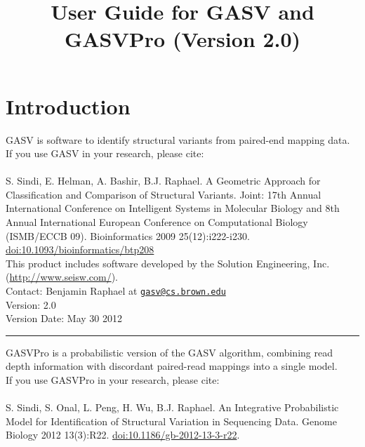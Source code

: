 \documentclass[11pt]{article}
\title{User Guide for GASV and GASVPro (Version 2.0)}
\date{}                                           %
\newcommand{\sectionline}{
  \nointerlineskip \vspace{\baselineskip}
  \hspace{\fill}\rule{0.3\linewidth}{.7pt}\hspace{\fill}
  \par\nointerlineskip \vspace{\baselineskip}
}
\begin{document}
\maketitle

\tableofcontents
\clearpage

\section{Introduction}

GASV is software to identify structural variants from paired-end mapping data. \\

\noindent If you use GASV in your research, please cite: \\ \\
S. Sindi, E. Helman, A. Bashir, B.J. Raphael. A Geometric Approach for
Classification and Comparison of Structural Variants. Joint: 17th
Annual International Conference on Intelligent Systems in Molecular
Biology and 8th Annual International European Conference on
Computational Biology (ISMB/ECCB 09).  Bioinformatics 2009
25(12):i222-i230. \href{http://dx.doi.org/10.1093/bioinformatics/btp208}{doi:10.1093/bioinformatics/btp208}\\

\noindent This product includes software developed by the Solution Engineering,
Inc. (\url{http://www.seisw.com/}).\\

\noindent Contact: Benjamin Raphael at \href{mailto:gasv@cs.brown.edu}{\nolinkurl{gasv@cs.brown.edu}}\\

\noindent Version: 2.0 \\
\noindent Version Date: May 30 2012 

\sectionline

\noindent GASVPro is a probabilistic version of the GASV algorithm, combining read depth information with discordant paired-read mappings into a single model. \\

\noindent If you use GASVPro in your research, please cite: \\ \\ 
S. Sindi, S. Onal, L. Peng, H. Wu, B.J. Raphael. An Integrative Probabilistic Model for Identification of Structural Variation in Sequencing Data. Genome Biology 2012 13(3):R22. \href{http://dx.doi.org/10.1186/gb-2012-13-3-r22}{doi:10.1186/gb-2012-13-3-r22}.\\
\end{document}
